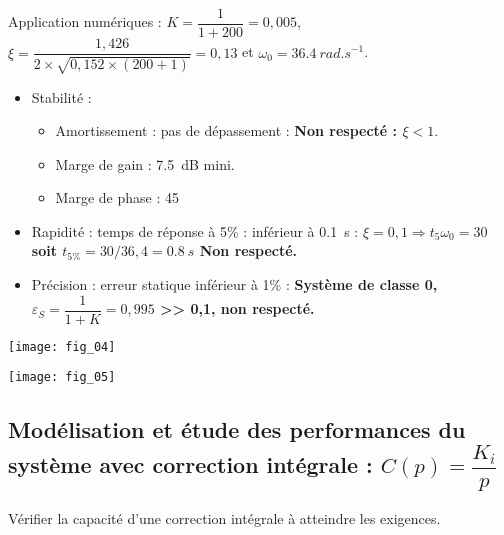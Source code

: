 \begin{multicols}{2}
\begin{corrige}
Application numériques : 
$K = \dfrac{1}{1+200} = 0,005$, $\xi = \dfrac{1,426}{2 \times  \sqrt{0,152\times (200 +1)}}=0,13$ et $\omega_0 = \SI{36,4}{rad.s^{-1}}$.
\end{corrige}
\else
\fi

\ifprof
\begin{corrige}
\begin{itemize}
\item Stabilité : 
\begin{itemize}
\item Amortissement : pas de dépassement : \textbf{Non respecté : $\xi <1$}. 
\item Marge de gain : \SI{7,5}{dB} mini.
\item Marge de phase : \SI{45}{\degres} 
\end{itemize}
\item Rapidité : temps de réponse à 5\% : inférieur à \SI{0,1}{s} : \textbf{$\xi = 0,1 \Rightarrow t_5\omega_0 = 30$ soit $t_{5\%} = 30 / 36,4 =\SI{0,8}{s}$ Non respecté.}
\item Précision : erreur statique inférieur à 1\%  : \textbf{Système de classe 0, $\varepsilon_S = \dfrac{1}{1+K} = 0,995$  >> 0,1, non respecté.}
\end{itemize}
\end{corrige}
\else
\fi


\begin{center}
\texttt{[image: fig\_04]}
\end{center}


\begin{center}
\texttt{[image: fig\_05]}
\end{center}

\subsection*{Modélisation et étude des performances du système avec correction intégrale : $C(p) = \dfrac{K_i}{p}$}

\begin{obj}
Vérifier la capacité d’une correction intégrale à atteindre les exigences.
\end{obj}

\ifprof
\begin{corrige}
\end{corrige}
\else
\fi



\end{multicols}
